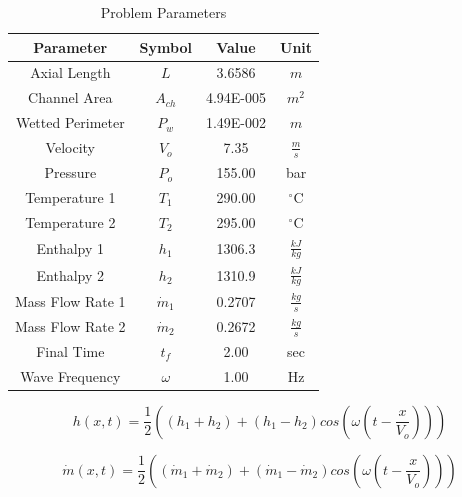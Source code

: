 \documentclass{mc2015}
\begin{document}
\begin{table}[h]
\center
\caption{Problem Parameters}
\label{table:parameters}
\begin{tabular}{|c|c|c|c|}
\hline
Parameter	&	Symbol	&	Value	&	Unit	\\ \hline
Axial Length	&	$L$	&	3.6586	&	$m$	\\ \hline
Channel Area	&	$A_{ch}$	&	4.94E-005	&	$m^{2}$	\\ \hline
Wetted Perimeter	&	$P_{w}$	&	1.49E-002	&	$m$	\\ \hline
Velocity	&	$V_{o}$	&	7.35	&	$\frac{m}{s}$	\\ \hline
Pressure	&	$P_{o}$	&	155.00	&	bar	\\ \hline
Temperature 1	&	$T_{1}$	&	290.00	&	$^{\circ}$C	\\ \hline
Temperature 2	&	$T_{2}$	&	295.00	&	$^{\circ}$C	\\ \hline
Enthalpy 1	&	$h_{1}$	&	1306.3	&	$\frac{kJ}{kg}$	\\ \hline
Enthalpy 2	&	$h_{2}$	&	1310.9	&	$\frac{kJ}{kg}$	\\ \hline
Mass Flow Rate 1	&	$\dot{m}_{1}$	&	0.2707	&	$\frac{kg}{s}$	\\ \hline
Mass Flow Rate 2	&	$\dot{m}_{2}$	&	0.2672	&	$\frac{kg}{s}$	\\ \hline
Final Time	&	$t_{f}$	&	2.00	&	sec	\\ \hline
Wave Frequency	&	$\omega$	&	1.00	&	Hz	\\ \hline
\end{tabular}
\end{table}


%
%
%

\begin{equation}
	\label{eq:Sine_Wave:h}
	h(x,t) = \frac{1}{2} \left( 
			(h_{1}+h_{2}) + (h_{1}-h_{2}) cos\left(
				\omega \left( t - \frac{x}{V_{o}} \right)
				\right)
			\right)
\end{equation}

\begin{equation}
	\label{eq:Sine_Wave:m_dot}
	\dot{m}(x,t) = \frac{1}{2} \left( 
			(\dot{m}_{1}+\dot{m}_{2}) + (\dot{m}_{1}-\dot{m}_{2}) cos\left(
				\omega \left( t - \frac{x}{V_{o}} \right)
				\right)
			\right)
\end{equation}
\end{document}
